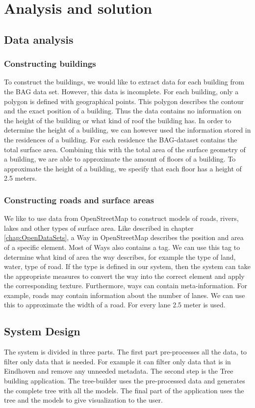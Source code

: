 \chapter{Analysis and solution}
\label{chap:AnalysisAndSolution}
\section{Data analysis}
\label{sec:DataAnalysis}
\subsection{Constructing buildings}
To construct the buildings, we would like to extract data for each building from the BAG data set. However, this data is incomplete. For each building, only a polygon is defined with geographical points. This polygon describes the contour and the exact position of a building. Thus the data contains no information on the height of the building or what kind of roof the building has. In order to determine the height of a building, we can however used the information stored in the residences of a building. For each residence the BAG-dataset contains the total surface area. Combining this with the total area of the surface geometry of a building, we are able to approximate the amount of floors of a building. To approximate the height of a building, we specify that each floor has a height of 2.5 meters.

\subsection{Constructing roads and surface areas}
We like to use data from OpenStreetMap to construct models of roads, rivers, lakes and other types of surface area. Like described in chapter \ref{chap:OpenDataSets}, a Way in OpenStreetMap describes the position and area of a specific element. Most of Ways also contains a tag. We can use this tag to determine what kind of area the way describes, for example the type of land, water, type of road. If the type is defined in our system, then the system can take the appropriate measures to convert the way into the correct element and apply the corresponding texture. Furthermore, ways can contain meta-information. For example, roads may contain information about the number of lanes. We can use this to approximate the width of a road. For every lane 2.5 meter is used.

\section{System Design}
\label{sec:SystemDesign}
The system is divided in three parts. The first part pre-processes all the data, to filter only data that is needed. For example it can filter only data that is in Eindhoven and remove any unneeded metadata. The second step is the Tree building application. The tree-builder uses the pre-processed data and generates the complete tree with all the models. The final part of the application uses the tree and the models to give visualization to the user.

